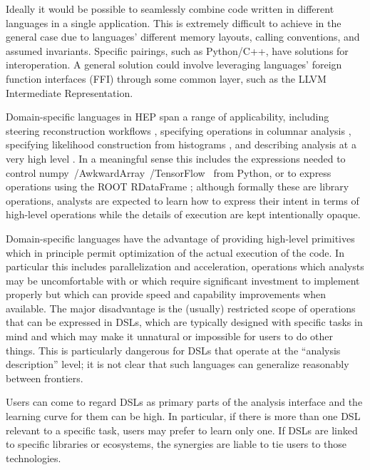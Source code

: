 Ideally it would be possible to seamlessly combine code written in different languages in a single application. This is extremely difficult to achieve in the general case due to languages' different memory layouts, calling conventions, and assumed invariants. Specific pairings, such as Python/C++, have solutions for interoperation. A general solution could involve leveraging languages' foreign function interfaces (FFI) through some common layer, such as the LLVM \cite{LLVM:CGO04} Intermediate Representation.

Domain-specific languages in HEP span a range of applicability, including steering reconstruction workflows \cite{Bennett:2022gyi}, specifying operations in columnar analysis \cite{Proffitt:2021wfh}, specifying likelihood construction from histograms \cite{TRexFitter}, and describing analysis at a very high level \cite{Prosper:2022lnf}. In a meaningful sense this includes the expressions needed to control numpy~\cite{harris2020array}/AwkwardArray~\cite{jim_pivarski_2020_3952674}/TensorFlow~\cite{tensorflow_developers_2022_6574269} from Python, or to express operations using the ROOT RDataFrame \cite{Piparo:2019xdy}; although formally these are library operations, analysts are expected to learn how to express their intent in terms of high-level operations while the details of execution are kept intentionally opaque. 

Domain-specific languages have the advantage of providing high-level primitives which in principle permit optimization of the actual execution of the code. In particular this includes parallelization and acceleration, operations which analysts may be uncomfortable with or which require significant investment to implement properly but which can provide speed and capability improvements when available. The major disadvantage is the (usually) restricted scope of operations that can be expressed in DSLs, which are typically designed with specific tasks in mind and which may make it unnatural or impossible for users to do other things. This is particularly dangerous for DSLs that operate at the ``analysis description'' level; it is not clear that such languages can generalize reasonably between frontiers.

Users can come to regard DSLs as primary parts of the analysis interface and the learning curve for them can be high. In particular, if there is more than one DSL relevant to a specific task, users may prefer to learn only one. If DSLs are linked to specific libraries or ecosystems, the synergies are liable to tie users to those technologies.

